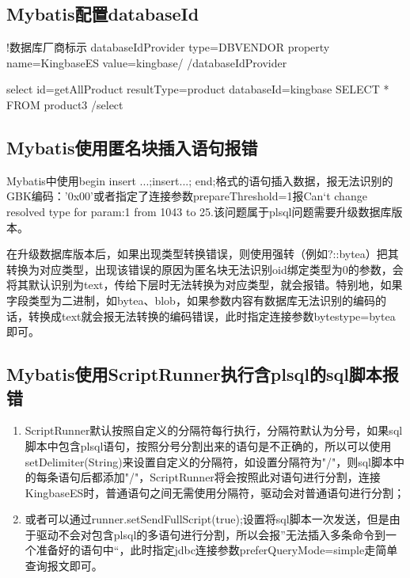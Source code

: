 \documentclass[letterpaper,10pt,english]{sphinxmanual}
\begin{document}
\subsection{Mybatis配置databaseId}
\label{\detokenize{interface/mybatis:mybatisdatabaseid}}
\begin{sphinxVerbatim}[commandchars=\\\{\}]
\PYGZlt{}!\PYGZhy{}\PYGZhy{}数据库厂商标示 \PYGZhy{}\PYGZhy{}\PYGZgt{}
    \PYGZlt{}databaseIdProvider type=\PYGZdq{}DB\PYGZus{}VENDOR\PYGZdq{}\PYGZgt{}
        \PYGZlt{}property name=\PYGZdq{}KingbaseES\PYGZdq{} value=\PYGZdq{}kingbase\PYGZdq{}/\PYGZgt{}
    \PYGZlt{}/databaseIdProvider\PYGZgt{}

\PYGZlt{}select id=\PYGZdq{}getAllProduct\PYGZdq{} resultType=\PYGZdq{}product\PYGZdq{} databaseId=\PYGZdq{}kingbase\PYGZdq{}\PYGZgt{}
        SELECT * FROM product3
\PYGZlt{}/select\PYGZgt{}
\end{sphinxVerbatim}


\subsection{Mybatis使用匿名块插入语句报错}
\label{\detokenize{interface/mybatis:id2}}
Mybatis中使用begin insert ...;insert...; end;格式的语句插入数据，报无法识别的GBK编码：'0x00'或者指定了连接参数prepareThreshold=\sphinxhyphen{}1报Can‘t change resolved type for param:1 from 1043 to 25.该问题属于plsql问题需要升级数据库版本。

在升级数据库版本后，如果出现类型转换错误，则使用强转（例如?::bytea）把其转换为对应类型，出现该错误的原因为匿名块无法识别oid绑定类型为0的参数，会将其默认识别为text，传给下层时无法转换为对应类型，就会报错。特别地，如果字段类型为二进制，如bytea、blob，如果参数内容有数据库无法识别的编码的话，转换成text就会报无法转换的编码错误，此时指定连接参数bytestype=bytea即可。


\subsection{Mybatis使用ScriptRunner执行含plsql的sql脚本报错}
\label{\detokenize{interface/mybatis:mybatisscriptrunnerplsqlsql}}\begin{enumerate}
%
\item {} 
ScriptRunner默认按照自定义的分隔符每行执行，分隔符默认为分号，如果sql脚本中包含plsql语句，按照分号分割出来的语句是不正确的，所以可以使用setDelimiter(String)来设置自定义的分隔符，如设置分隔符为"/"，则sql脚本中的每条语句后都添加"/"，ScriptRunner将会按照此对语句进行分割，连接KingbaseES时，普通语句之间无需使用分隔符，驱动会对普通语句进行分割；

\item {} 
或者可以通过runner.setSendFullScript(true);设置将sql脚本一次发送，但是由于驱动不会对包含plsql的多语句进行分割，所以会报”无法插入多条命令到一个准备好的语句中“，此时指定jdbc连接参数preferQueryMode=simple走简单查询报文即可。

\end{enumerate}
\end{document}
